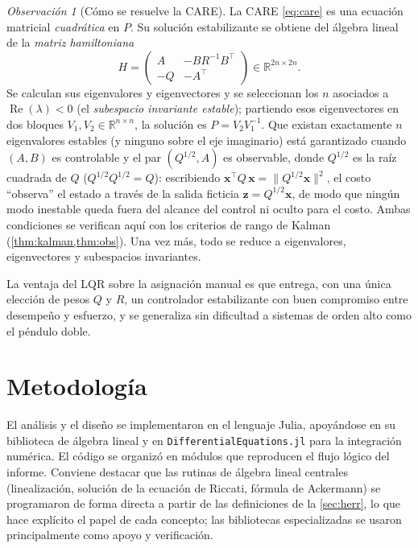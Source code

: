 \documentclass[11pt,letterpaper]{article}
\theoremstyle{definition}
\theoremstyle{plain}
\theoremstyle{remark}
\newtheorem{observacion}[definicion]{Observación}
\DeclareMathOperator{\Real}{Re}
\newcommand{\R}{\mathbb{R}}
\newcommand{\xv}{\bm{x}}
\begin{document}
\begin{observacion}[Cómo se resuelve la CARE]
\label{obs:hamilton}
La CARE \cref{eq:care} es una ecuación matricial \emph{cuadrática} en
$P$. Su solución estabilizante se obtiene del álgebra lineal de la
\emph{matriz hamiltoniana}
\begin{equation}\label{eq:hamilton}
  H=\begin{pmatrix}A & -BR^{-1}B^\top\\ -Q & -A^\top\end{pmatrix}
   \in\R^{2n\times 2n}.
\end{equation}
Se calculan sus eigenvalores y eigenvectores y se seleccionan los $n$
asociados a $\Real(\lambda)<0$ (el \emph{subespacio invariante estable});
partiendo esos eigenvectores en dos bloques $V_1,V_2\in\R^{n\times n}$, la
solución es $P=V_2V_1^{-1}$. Que existan exactamente $n$ eigenvalores
estables (y ninguno sobre el eje imaginario) está garantizado cuando
$(A,B)$ es controlable y el par $(Q^{1/2},A)$ es observable, donde
$Q^{1/2}$ es la raíz cuadrada de $Q$ ($Q^{1/2}Q^{1/2}=Q$): escribiendo
$\xv^\top Q\,\xv=\lVert Q^{1/2}\xv\rVert^2$, el costo ``observa'' el estado a
través de la salida ficticia $\bm z=Q^{1/2}\xv$, de modo que ningún modo
inestable queda fuera del alcance del control ni oculto para el costo. Ambas
condiciones se verifican aquí con los criterios de rango de Kalman
(\cref{thm:kalman,thm:obs}). Una vez más, todo se
reduce a eigenvalores, eigenvectores y subespacios invariantes.
\end{observacion}

La ventaja del LQR sobre la asignación manual es que entrega, con una
única elección de pesos $Q$ y $R$, un controlador estabilizante con buen
compromiso entre desempeño y esfuerzo, y se generaliza sin dificultad a
sistemas de orden alto como el péndulo doble.

\section{Metodología}
\label{sec:metodo}

El análisis y el diseño se implementaron en el lenguaje Julia, apoyándose
en su biblioteca de álgebra lineal y en \texttt{DifferentialEquations.jl}
para la integración numérica. El código se organizó en módulos que
reproducen el flujo lógico del informe. Conviene destacar que las rutinas
de álgebra lineal centrales (linealización, solución de la ecuación de
Riccati, fórmula de Ackermann) se programaron de forma directa a partir
de las definiciones de la \cref{sec:herr}, lo que hace explícito el papel
de cada concepto; las bibliotecas especializadas se usaron principalmente
como apoyo y verificación.
\end{document}
